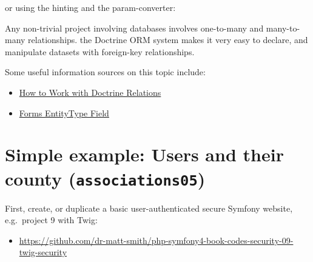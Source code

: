 \documentclass[a4paperpaper,openright]{book}
\newenvironment{Shaded}{}{}
\newcommand{\KeywordTok}[1]{\textcolor[rgb]{0.00,0.44,0.13}{\textbf{#1}}}
\newcommand{\NormalTok}[1]{#1}
\newcommand{\OtherTok}[1]{\textcolor[rgb]{0.00,0.44,0.13}{#1}}
\newcommand{\StringTok}[1]{\textcolor[rgb]{0.25,0.44,0.63}{#1}}
\providecommand{\tightlist}{%
  \setlength{\itemsep}{0pt}\setlength{\parskip}{0pt}}
\begin{document}
or using the hinting and the param-converter:

\begin{Shaded}
\end{Shaded}

Any non-trivial project involving databases involves one-to-many and
many-to-many relationships. the Doctrine ORM system makes it very easy
to declare, and manipulate datasets with foreign-key relationships.

Some useful information sources on this topic include:

\begin{itemize}
\item
  \href{http://symfony.com/doc/current/doctrine/associations.html}{How
  to Work with Doctrine Relations}
\item
  \href{http://symfony.com/doc/current/reference/forms/types/entity.html}{Forms
  EntityType Field}
\end{itemize}

\hypertarget{simple-example-users-and-their-county-associations05}{%
\section{\texorpdfstring{Simple example: Users and their county
(\texttt{associations05})}{Simple example: Users and their county (associations05)}}\label{simple-example-users-and-their-county-associations05}}

First, create, or duplicate a basic user-authenticated secure Symfony
website, e.g.~project 9 with Twig:

\begin{itemize}
\tightlist
\item
  \url{https://github.com/dr-matt-smith/php-symfony4-book-codes-security-09-twig-security}
\end{itemize}
\end{document}
